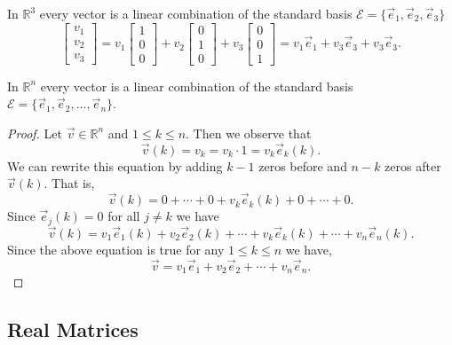 \begin{example}
In $\mathbb{R}^3 $ every vector is a linear combination of the standard basis 
$\mathcal{E}=\{\vec{e}_1,\vec{e}_2,\vec{e}_3\}$
\[
\begin{bmatrix}v_1 \\ v_2 \\ v_3\end{bmatrix}=
v_1 \begin{bmatrix}1 \\ 0 \\ 0\end{bmatrix}+
v_2 \begin{bmatrix}0 \\ 1 \\ 0\end{bmatrix}+
v_3 \begin{bmatrix}0 \\ 0 \\ 1\end{bmatrix}
=v_1\vec{e}_1+v_3\vec{e}_3+v_3\vec{e}_3.
\]
\end{example}

\begin{proposition}\label{prop:e_k_spans_Rn}
In $\mathbb{R}^n$ every vector is a linear combination of the standard basis 
$\mathcal{E}=\{\vec{e}_1, \vec{e}_2, \ldots, \vec{e}_n\}$.
\end{proposition}

\begin{proof}
Let $\vec{v} \in \mathbb{R}^n$ and $1\leq k\leq n$. Then we observe that  
\[\vec{v}(k)=v_k=v_k\cdot 1=v_k \vec{e}_k(k).\]
We can rewrite this equation by adding $k-1$ zeros before and $n-k$ zeros 
after $\vec{v}(k)$. That is,  
\[\vec{v}(k)=0+ \cdots + 0+v_k\vec{e}_k(k)+0+\cdots+0.\] 
Since $\vec{e}_j(k)=0$ for all $j\neq k$ we have 
\[\vec{v}(k)=v_1\vec{e}_1(k)+v_2\vec{e}_2(k)+\cdots+ v_k\vec{e}_k(k)+ \cdots + 
v_n\vec{e}_n(k).\]
Since the above equation is true for any $1\leq k\leq n$ we have,  
\[\vec{v}=v_1\vec{e}_1+v_2\vec{e}_2+\cdots+ v_n\vec{e}_n.\]
\end{proof}



\subsection{Real Matrices}

